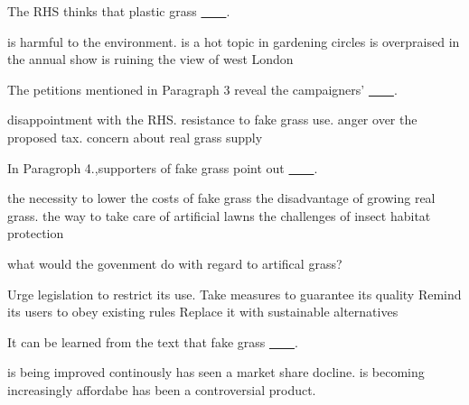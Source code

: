 \item The RHS thinks that plastic grass \uline{~~~~}.
\begin{tasks}
	\task is harmful to the environment.
	\task is a hot topic in gardening circles
	\task is overpraised in the annual show
	\task is ruining the view of west London
\end{tasks}
\item The petitions mentioned in Paragraph 3 reveal the campaigners' \uline{~~~~}.
\begin{tasks}
	\task disappointment with the RHS.
	\task resistance to fake grass use.
	\task anger over the proposed tax.
	\task concern about real grass supply
\end{tasks}
\item In Paragroph 4.,supporters of fake grass point out \uline{~~~~}.
\begin{tasks}
	\task the necessity to lower the costs of fake grass
	\task the disadvantage of growing real grass.
	\task the way to take care of artificial lawns
	\task the challenges of insect habitat protection
\end{tasks}
\item what would the govenment do with regard to artifical grass?
\begin{tasks}
	\task Urge legislation to restrict its use.
	\task Take measures to guarantee its quality
	\task Remind its users to obey existing rules
	\task Replace it with sustainable alternatives
\end{tasks}
\item It can be learned from the text that fake grass \uline{~~~~}.
\begin{tasks}
	\task is being improved continously
	\task has seen a market share docline.
	\task is becoming increasingly affordabe
	\task has been a controversial product.
\end{tasks}